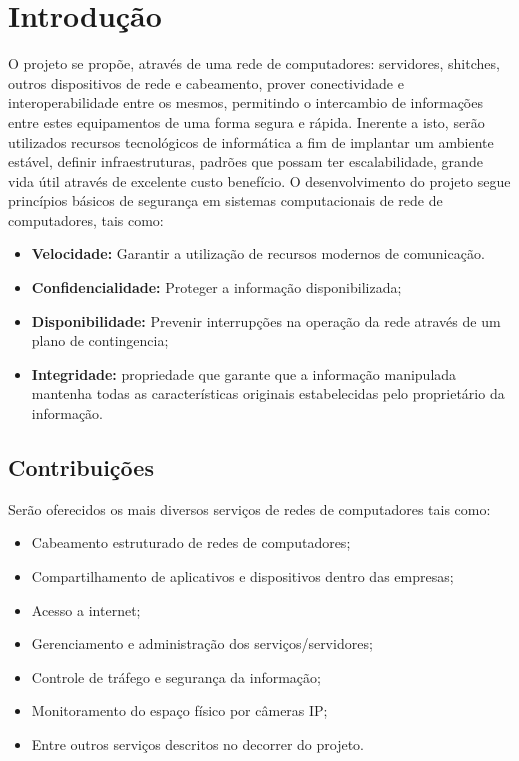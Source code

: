 \documentclass[	DIV=calc,%
paper=a4,%
fontsize=12pt,%
onecolumn]{scrartcl}	 					%
\begin{document}
	\section{Introdução}
	O projeto se propõe, através de uma rede de computadores: servidores, shitches, outros dispositivos de rede e cabeamento, prover conectividade e interoperabilidade entre os mesmos, permitindo o intercambio de informações entre estes equipamentos de uma forma segura e rápida. Inerente a isto, serão utilizados recursos tecnológicos de informática a fim de implantar um ambiente estável, definir infraestruturas, padrões que possam ter escalabilidade, grande vida útil através de excelente custo benefício. O desenvolvimento do projeto segue princípios básicos de segurança em sistemas computacionais de rede de computadores, tais como: 
	\begin{itemize}
		\item \textbf{Velocidade:} Garantir a utilização de recursos modernos de comunicação. 
		\item \textbf{Confidencialidade:} Proteger a informação disponibilizada; 
		\item  \textbf{Disponibilidade:} Prevenir interrupções na operação da rede através de um plano de contingencia;
		\item \textbf{Integridade:} propriedade que garante que a informação manipulada mantenha todas as características originais estabelecidas pelo proprietário da informação.
	\end{itemize}
	\subsection{Contribuições}
	Serão oferecidos os mais diversos serviços de redes de computadores tais como: 
	\begin{itemize}
		\item Cabeamento estruturado de redes de computadores;
		\item Compartilhamento de aplicativos e dispositivos dentro das empresas; 
		\item Acesso a internet;
		\item Gerenciamento e administração dos serviços/servidores;
		\item Controle de tráfego e segurança da informação; 
		\item Monitoramento do espaço físico por câmeras IP;
		\item Entre outros serviços descritos no decorrer do projeto.
	\end{itemize}	
\end{document}
